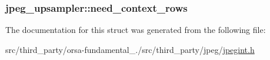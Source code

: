 \subsubsection[{need\+\_\+context\+\_\+rows}]{ jpeg\+\_\+upsampler\+::need\+\_\+context\+\_\+rows}\label{structjpeg__upsampler_af1ed2e1ca01280221b9c1305fc557e45}


The documentation for this struct was generated from the following file\+:\begin{DoxyCompactItemize}
\item 
src/third\+\_\+party/orsa-\/fundamental\+\_./src/third\+\_\+party/jpeg/\hyperlink{jpegint_8h}{jpegint.\+h}\end{DoxyCompactItemize}
